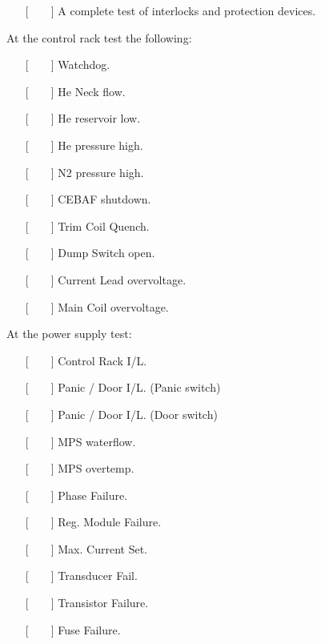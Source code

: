 {\begin{itemize}
\item[{[~~~~]}] {A complete test of interlocks and protection devices.~\cite{bi:oxf2,bi:danf}}
\end{itemize}

At the control rack test the following:

\begin{itemize}
\item[{[~~~~]}]{Watchdog.}
\item[{[~~~~]}]{He Neck flow.}
\item[{[~~~~]}]{He reservoir low.}
\item[{[~~~~]}]{He pressure high.}
\item[{[~~~~]}]{N2 pressure high.}
\item[{[~~~~]}]{CEBAF shutdown.}
\item[{[~~~~]}]{Trim Coil Quench.}
\item[{[~~~~]}]{Dump Switch open.}
\item[{[~~~~]}]{Current Lead overvoltage.}
\item[{[~~~~]}]{Main Coil overvoltage.}
\end{itemize}


At the power supply test:

\begin{itemize}
\item[{[~~~~]}]{Control Rack I/L.}
\item[{[~~~~]}]{Panic / Door I/L. (Panic switch)}
\item[{[~~~~]}]{Panic / Door I/L. (Door switch)}
\item[{[~~~~]}]{MPS waterflow.}
\item[{[~~~~]}]{MPS overtemp.}
\item[{[~~~~]}]{Phase Failure.}
\item[{[~~~~]}]{Reg. Module Failure.}
\item[{[~~~~]}]{Max. Current Set.}
\item[{[~~~~]}]{Transducer Fail.}
\item[{[~~~~]}]{Transistor Failure.}
\item[{[~~~~]}]{Fuse Failure.}
\end{itemize}

}
